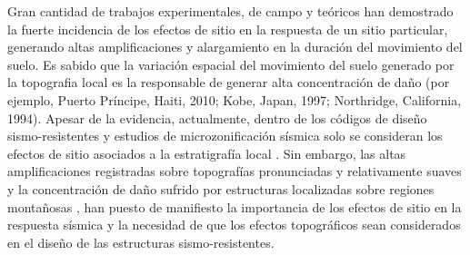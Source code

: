 \documentclass[spanish,letterpaper,12pt,twoside,openany]{article}
\begin{document}
%
%
Gran cantidad de trabajos experimentales, de campo y teóricos han demostrado la fuerte incidencia de los efectos de sitio en la respuesta de un sitio particular, generando altas  amplificaciones y alargamiento en la duración del movimiento del suelo. Es sabido que la variación espacial del movimiento del suelo generado por la topografia local es la responsable de generar alta concentración de daño (por ejemplo, Puerto Príncipe, Haiti, 2010; Kobe, Japan, 1997; Northridge, California, 1994). Apesar de la evidencia, actualmente, dentro de los códigos de diseño sismo-resistentes y estudios de microzonificación sísmica solo se consideran los efectos de sitio asociados a la estratigrafía local \citep{Kaklamanos2015, Idriss1992user, Schnabel1972shake}. Sin embargo, las altas amplificaciones registradas sobre topografías pronunciadas y relativamente suaves \citep{spudich1996directional, Griffiths1979} y la concentración de daño sufrido por estructuras localizadas sobre regiones montañosas \citep{assimaki2005soil, assimaki2005effects, Hough2011, Assimaki2013}, han puesto de manifiesto la importancia de los efectos de sitio en la respuesta sísmica y la necesidad de que los efectos topográficos sean considerados en el diseño de las estructuras sismo-resistentes.
\end{document}
